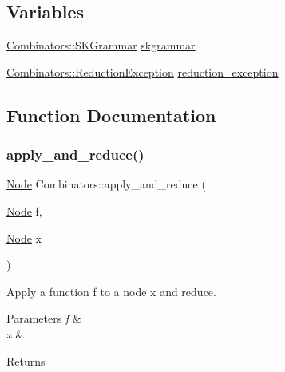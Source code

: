 \subsection*{Variables}
\begin{DoxyCompactItemize}
\item 
\hyperlink{class_combinators_1_1_s_k_grammar}{Combinators\+::\+S\+K\+Grammar} \hyperlink{namespace_combinators_a24aeacfa083d06000a89cb59d14eeccb}{skgrammar}
\item 
\hyperlink{class_combinators_1_1_reduction_exception}{Combinators\+::\+Reduction\+Exception} \hyperlink{namespace_combinators_a47aa4c813bc5305c8b818c9be952235c}{reduction\+\_\+exception}
\end{DoxyCompactItemize}


\subsection{Function Documentation}
\mbox{\label{namespace_combinators_a30e2a8ed9eb766eb35ce3feb10cbd59a}} 
\subsubsection{\texorpdfstring{apply\+\_\+and\+\_\+reduce()}{apply\_and\_reduce()}}
{\footnotesize\ttfamily \hyperlink{class_node}{Node} Combinators\+::apply\+\_\+and\+\_\+reduce (\begin{DoxyParamCaption}\item[{\hyperlink{class_node}{Node}}]{f,  }\item[{\hyperlink{class_node}{Node}}]{x }\end{DoxyParamCaption})}



Apply a function f to a node x and reduce. 


\begin{DoxyParams}{Parameters}
{\em f} & \\
\hline
{\em x} & \\
\hline
\end{DoxyParams}
\begin{DoxyReturn}{Returns}

\end{DoxyReturn}
\mbox{\label{namespace_combinators_aa3c93f1edab6764d54dda56aafac9cd3}} 
